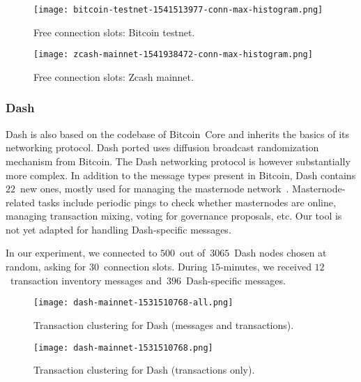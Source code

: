 \begin{figure*}
	\centering
	\begin{minipage}{0.5\textwidth}
		\centering
		\texttt{[image: bitcoin-testnet-1541513977-conn-max-histogram.png]}
		\caption{Free connection slots: Bitcoin testnet.}
		\label{fig:free-slots-bitcoin}
	\end{minipage}\hfill
	\begin{minipage}{0.5\textwidth}
		\centering
		\texttt{[image: zcash-mainnet-1541938472-conn-max-histogram.png]}
		\caption{Free connection slots: Zcash mainnet.}
		\label{fig:free-slots-zcash}
	\end{minipage}\hfill
\end{figure*}


\subsubsection{Dash}

Dash is also based on the codebase of Bitcoin~Core and inherits the basics of its networking protocol.
Dash ported uses diffusion broadcast randomization mechanism from Bitcoin.
The Dash networking protocol is however substantially more complex.
In addition to the message types present in Bitcoin, Dash contains $22$~new ones, mostly used for managing the masternode network~\cite{Schinzel2015}.
Masternode-related tasks include periodic pings to check whether masternodes are online, managing transaction mixing, voting for governance proposals, etc.
Our tool is not yet adapted for handling Dash-specific messages.

In our experiment, we connected to $500$~out of~$3065$~Dash nodes chosen at random, asking for $30$~connection slots.
During $15$-minutes, we received $12$~transaction inventory messages and~$396$~Dash-specific messages.

\begin{figure*}
	\centering
	\begin{minipage}{0.5\textwidth}
		\centering
		\texttt{[image: dash-mainnet-1531510768-all.png]}
		\caption{Transaction clustering for Dash (messages and transactions).}
		\label{fig:dash-all}
	\end{minipage}\hfill
	\begin{minipage}{0.5\textwidth}
		\centering
		\texttt{[image: dash-mainnet-1531510768.png]}
		\caption{Transaction clustering for Dash (transactions only).}
		\label{fig:dash-tx}
	\end{minipage}\hfill
\end{figure*}


